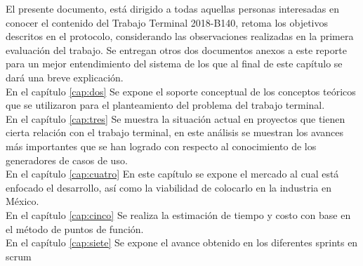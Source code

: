 El presente documento, está dirigido a todas aquellas personas interesadas en conocer el contenido del Trabajo Terminal 2018-B140, retoma los objetivos descritos en el protocolo, considerando las observaciones realizadas en la primera evaluación del trabajo. Se entregan otros dos documentos anexos a este reporte para un mejor entendimiento del sistema de los que al final de este capítulo se dará una breve explicación.\\

En el capítulo  \ref{cap:dos} Se expone el soporte conceptual de los conceptos teóricos que se utilizaron para el planteamiento del problema del trabajo terminal. \\

En el capítulo  \ref{cap:tres} Se muestra la situación actual en proyectos que tienen cierta relación con el trabajo terminal, en este análisis se muestran los avances más importantes que se han logrado con respecto al conocimiento de los generadores de casos de uso.\\

En el capítulo  \ref{cap:cuatro} En este capítulo se expone el mercado al cual está enfocado
el desarrollo, así como la viabilidad de colocarlo en la industria en México.\\

En el capítulo  \ref{cap:cinco} Se realiza la estimación de tiempo y costo con base en el método de puntos de función.\\

En el capítulo  \ref{cap:siete} Se expone el avance obtenido en los diferentes sprints en scrum \\